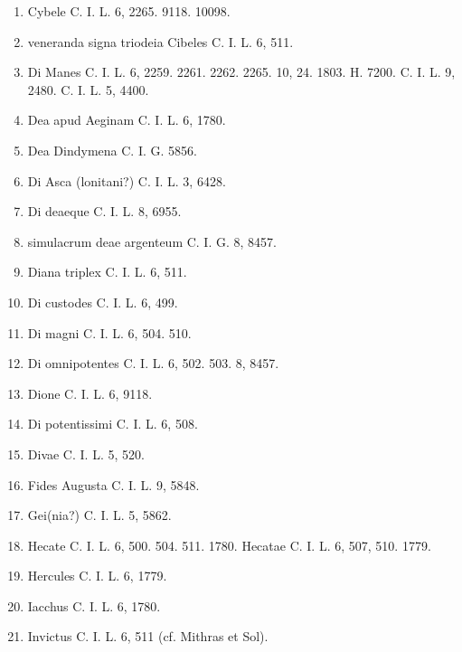 \documentclass[a4paper, 11pt, oneside, polutonikogreek, german, twocolumn]{article}
\begin{document}
\begin{enumerate}
\item Cybele C. I. L. 6, 2265. 9118. 10098.

\item veneranda signa triodeia Cibeles C. I. L. 6, 511.

\item Di Manes C. I. L. 6, 2259. 2261. 2262. 2265. 10, 24. 1803. H. 7200. C. I. L. 9, 2480. C. I. L. 5, 4400.

\item Dea apud Aeginam C. I. L. 6, 1780.

\item Dea Dindymena C. I. G. 5856.

\item Di Asca (lonitani?) C. I. L. 3, 6428.

\item Di deaeque C. I. L. 8, 6955.

\item simulacrum deae argenteum C. I. G. 8, 8457.

\item Diana triplex C. I. L. 6, 511.

\item Di custodes C. I. L. 6, 499.

\item Di magni C. I. L. 6, 504. 510.

\item Di omnipotentes C. I. L. 6, 502. 503. 8, 8457.

\item Dione C. I. L. 6, 9118.

\item Di potentissimi C. I. L. 6, 508.

\item Divae C. I. L. 5, 520.

\item Fides Augusta C. I. L. 9, 5848.

\item Gei(nia?) C. I. L. 5, 5862.

\item Hecate C. I. L. 6, 500. 504. 511. 1780. Hecatae C. I. L. 6, 507, 510. 1779.

\item Hercules C. I. L. 6, 1779.

\item Iacchus C. I. L. 6, 1780.

\item Invictus C. I. L. 6, 511 (cf. Mithras et Sol).


\end{enumerate}
\end{document}
